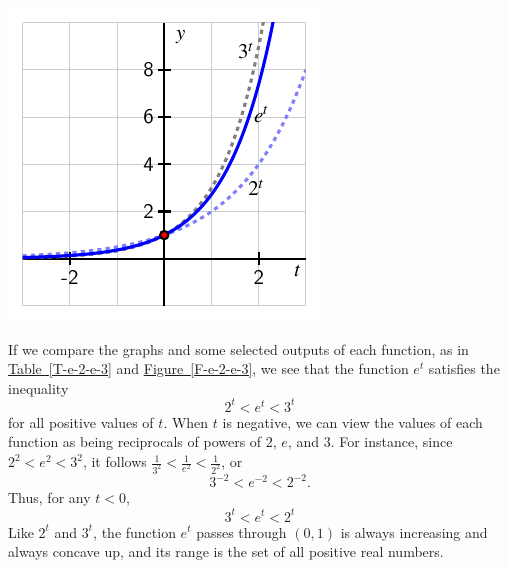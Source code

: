\documentclass[nooutcomes]{ximera}
\begin{document}

\begin{image}
\includegraphics{e-2-e-3}
\end{image}

If we compare the graphs and some selected outputs of each function, as in \hyperref[T-e-2-e-3]{Table~\ref{T-e-2-e-3}} and \hyperref[F-e-2-e-3]{Figure~\ref{F-e-2-e-3}}, we see that the function $e^t$ satisfies the inequality%
\begin{equation*}
2^t \lt e^t \lt 3^t
\end{equation*}
for all positive values of $t$.  When $t$ is negative, we can view the values of each function as being reciprocals of powers of $2$, $e$, and $3$.  For instance, since $2^2 \lt e^2 \lt 3^2$, it follows $\frac{1}{3^2} \lt \frac{1}{e^2} \lt \frac{1}{2^2}$, or%
\begin{equation*}
3^{-2} \lt e^{-2} \lt 2^{-2}\text{.}
\end{equation*}
Thus, for any $t \lt 0$,%
\begin{equation*}
3^t \lt e^t \lt 2^t
\end{equation*}
Like $2^t$ and $3^t$, the function $e^t$ passes through $(0,1)$ is always increasing and always concave up, and its range is the set of all positive real numbers.
\end{document}
